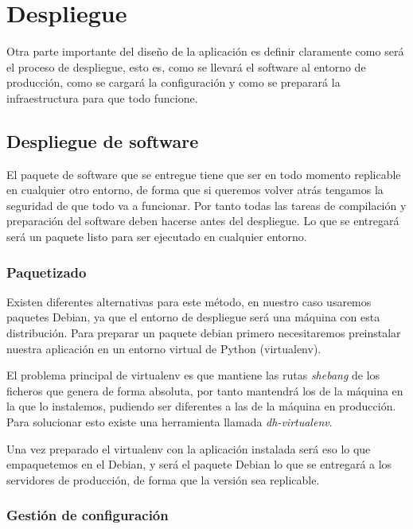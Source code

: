 \documentclass[12pt,a4paperpaper,]{report}
\begin{document}
\section{Despliegue}\label{despliegue}

Otra parte importante del diseño de la aplicación es definir claramente
como será el proceso de despliegue, esto es, como se llevará el software
al entorno de producción, como se cargará la configuración y como se
preparará la infraestructura para que todo funcione.

\subsection{Despliegue de software}\label{despliegue-de-software}

El paquete de software que se entregue tiene que ser en todo momento
replicable en cualquier otro entorno, de forma que si queremos volver
atrás tengamos la seguridad de que todo va a funcionar. Por tanto todas
las tareas de compilación y preparación del software deben hacerse antes
del despliegue. Lo que se entregará será un paquete listo para ser
ejecutado en cualquier entorno.

\subsubsection{Paquetizado}\label{paquetizado}

Existen diferentes alternativas para este método, en nuestro caso
usaremos paquetes Debian, ya que el entorno de despliegue será una
máquina con esta distribución. Para preparar un paquete debian primero
necesitaremos preinstalar nuestra aplicación en un entorno virtual de
Python (virtualenv).

El problema principal de virtualenv es que mantiene las rutas
\emph{shebang} de los ficheros que genera de forma absoluta, por tanto
mantendrá los de la máquina en la que lo instalemos, pudiendo ser
diferentes a las de la máquina en producción. Para solucionar esto
existe una herramienta llamada \emph{dh-virtualenv}.

Una vez preparado el virtualenv con la aplicación instalada será eso lo
que empaquetemos en el Debian, y será el paquete Debian lo que se
entregará a los servidores de producción, de forma que la versión sea
replicable.

\subsubsection{Gestión de
configuración}\label{gestiuxf3n-de-configuraciuxf3n-1}
\end{document}

